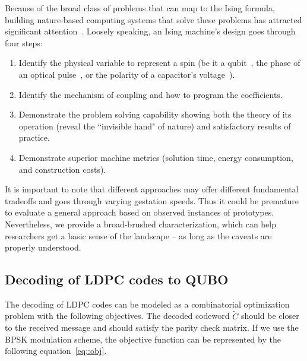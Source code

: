 Because of the broad class of problems that can map to the Ising formula,
building nature-based computing systems that solve these problems has
attracted significant attention~\cite{kim2010quantum,berloff2017realizing,
barends2016digitized,yamaoka201520k,bunyk2014architectural,king2018observation,
bohm2019poor,hamerly2019towards,pierangeli2019large}.
Loosely speaking, an Ising machine's design goes through four
steps:
\begin{enumerate}

\item Identify the physical variable to represent a spin (be it a 
qubit~\cite{PhysRevB.82.024511}, the phase of an optical pulse~\cite{inagaki2016coherent}, 
or the polarity of a capacitor's voltage~\cite{afoakwa.hpca21}).

\item Identify the mechanism of coupling and how to program the coefficients.

\item Demonstrate the problem solving capability showing both the theory of its
operation (reveal the ``invisible hand" of nature) and satisfactory results
of practice.

\item Demonstrate superior machine metrics (solution time, energy consumption,
and construction costs).

\end{enumerate} It is important to note that different approaches may
offer different fundamental tradeoffs and goes through varying gestation
speeds. Thus it could be premature to evaluate a general approach based on
observed instances of prototypes. Nevertheless, we provide a broad-brushed
characterization, which can help researchers get a 
basic sense of the landscape -- as long as the caveats are properly understood.

\subsection{Decoding of LDPC codes to QUBO} \label{sec:QUBO_formulation}

The decoding of LDPC codes can be modeled as a combinatorial optimization problem with the following objectives. The decoded codeword $\tilde{C}$ should be closer to the received message and should satisfy the parity check matrix. If we use the BPSK modulation scheme, the objective function can be represented by the following equation~\ref{eq::obj}.

